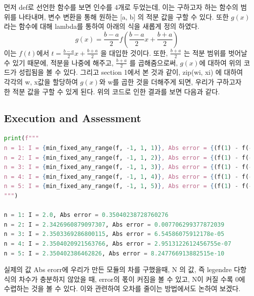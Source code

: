 \documentclass[11pt]{article}
\begin{document}
먼저 def로 선언한 함수를 보면 인수를 4개로 두었는데, 이는 구하고자 하는 함수의 범위를 나타내며, 변수 변환을 통해 원하는 [a, b] 의 적분 값을 구할 수 있다. 또한 $g(x)$ 라는 함수에 대해 lambda를 통하여 아래의 식을 새롭게 정의 하였다.
\begin{equation}
g(x) = \frac{b - a}{2}  f( \frac{b - a}{2}x + \frac{b + a}{2} )
\end{equation}
이는 $f(t)$에서 $t = \frac{b - a}{2}x + \frac{b + a}{2}$ 을 대입한 것이다. 또한, $\frac{b + a}{2}$ 는 적분 범위를 벗어날 수 있기 때문에, 적분을 나중에 해주고, $\frac{b + a}{2}$  를 곱해줌으로써, $g(x)$에 대하여 위의 코드가 성립됨을 볼 수 있다. 그리고 section 1에서 본 것과 같이, zip(wi, xi) 에 대하여 각각의 w, x값을 할당하여 $g(x)$와 w를 곱한 것을 더해주게 되면, 우리가 구하고자 한 적분 값을 구할 수 있게 된다. 위의 코드로 인한 결과를 보면 다음과 같다.

\subsection{Execution and Assessment} 
\begin{lstlisting}[language=Python]
print(f"""
n = 1: I = {min_fixed_any_range(f, -1, 1, 1)}, Abs error = {(f(1) - f(-1)) - min_fixed_any_range(f, -1, 1, 1)}
n = 2: I = {min_fixed_any_range(f, -1, 1, 2)}, Abs error = {(f(1) - f(-1)) - min_fixed_any_range(f, -1, 1, 2)}
n = 3: I = {min_fixed_any_range(f, -1, 1, 3)}, Abs error = {(f(1) - f(-1)) - min_fixed_any_range(f, -1, 1, 3)}
n = 4: I = {min_fixed_any_range(f, -1, 1, 4)}, Abs error = {(f(1) - f(-1)) - min_fixed_any_range(f, -1, 1, 4)}
n = 5: I = {min_fixed_any_range(f, -1, 1, 5)}, Abs error = {(f(1) - f(-1)) - min_fixed_any_range(f, -1, 1, 5)}
""")

n = 1: I = 2.0, Abs error = 0.35040238728760276
n = 2: I = 2.3426960879097307, Abs error = 0.007706299377872039
n = 3: I = 2.3503369286800115, Abs error = 6.54586075912178e-05
n = 4: I = 2.3504020921563766, Abs error = 2.9513122612456755e-07
n = 5: I = 2.350402386462826, Abs error = 8.247766913882515e-10
\end{lstlisting}

실제의 값 Abs erorr에 우리가 만든 모듈의 차를 구했을때, N 의 값, 즉 legendre 다항식의 차수가 충분하지 않았을 때, error의 폯이 커짐을 볼 수 있고, N이 커질 수록 0에 수렵하는 것을 볼 수 있다. 이와 관련하여 오차를 줄이는 방법에서도 논하여 보겠다.
\end{document}
